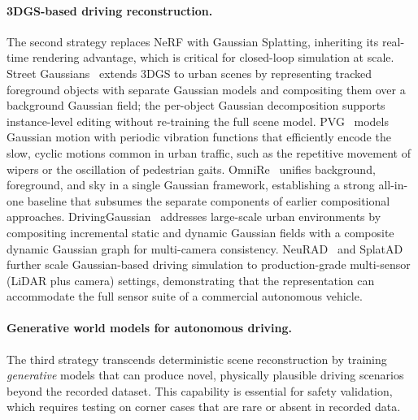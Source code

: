 \paragraph{3DGS-based driving reconstruction.}
The second strategy replaces NeRF with Gaussian Splatting, inheriting its
real-time rendering advantage, which is critical for closed-loop simulation
at scale.
Street Gaussians~\citep{yan2024streetgaussian} extends 3DGS to urban scenes
by representing tracked foreground objects with separate Gaussian models and
compositing them over a background Gaussian field; the per-object Gaussian
decomposition supports instance-level editing without re-training the full
scene model.
PVG~\citep{chen2023pvg} models Gaussian motion with periodic vibration functions
that efficiently encode the slow, cyclic motions common in urban traffic,
such as the repetitive movement of wipers or the oscillation of pedestrian gaits.
OmniRe~\citep{chen2024omnire} unifies background, foreground, and sky in
a single Gaussian framework, establishing a strong all-in-one baseline that
subsumes the separate components of earlier compositional approaches.
DrivingGaussian~\citep{wang2024drivinggaussian} addresses large-scale urban
environments by compositing incremental static and dynamic Gaussian fields
with a composite dynamic Gaussian graph for multi-camera consistency.
NeuRAD~\citep{tonderski2024neurad} and SplatAD~\citep{hess2024splatad} further
scale Gaussian-based driving simulation to production-grade multi-sensor (LiDAR
plus camera) settings, demonstrating that the representation can accommodate
the full sensor suite of a commercial autonomous vehicle.

\paragraph{Generative world models for autonomous driving.}
The third strategy transcends deterministic scene reconstruction by training
\emph{generative} models that can produce novel, physically plausible driving
scenarios beyond the recorded dataset.
This capability is essential for safety validation, which requires testing on
corner cases that are rare or absent in recorded data.

